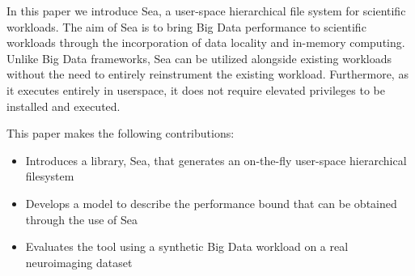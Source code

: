
In this paper we introduce Sea, a user-space hierarchical file system for
scientific workloads. The aim of Sea is to bring Big Data performance to
scientific workloads through the incorporation of data locality and in-memory
computing. Unlike Big Data frameworks, Sea can be utilized alongside existing
workloads without the need to entirely reinstrument the existing workload.
Furthermore, as it executes entirely in userspace, it does not require elevated
privileges to be installed and executed.

This paper makes the following contributions:
\begin{itemize}
    \item Introduces a library, Sea, that generates an on-the-fly user-space
    hierarchical filesystem
    \item Develops a model to describe the performance bound that can be
    obtained through the use of Sea
    \item Evaluates the tool using a synthetic Big Data workload on a real
    neuroimaging dataset
\end{itemize}







